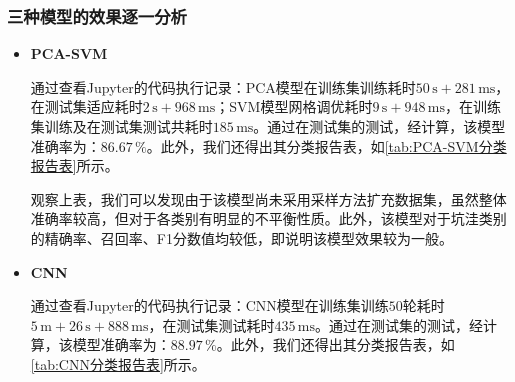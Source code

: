 \documentclass{MathorCupmodeling}
\begin{document}
	\subsubsection{三种模型的效果逐一分析}\label{模型效果}
	\begin{itemize}
		\item \textbf{PCA-SVM}

		通过查看Jupyter的代码执行记录：PCA模型在训练集训练耗时$50\,\text{s}+281\,\text{ms}$，在测试集适应耗时$2\,\text{s}+968\,\text{ms}$；SVM模型网格调优耗时$9\,\text{s}+948\,\text{ms}$，在训练集训练及在测试集测试共耗时$185\,\text{ms}$。通过在测试集的测试，经计算，该模型准确率为：$86.67\,\%$。此外，我们还得出其分类报告表，如\textcolor{blue}{\cref{tab:PCA-SVM分类报告表}}所示。
\begin{table}[htbp]
	\centering
	\caption{PCA-SVM分类报告表}
	\label{tab:PCA-SVM分类报告表}
\end{table}
	观察上表，我们可以发现由于该模型尚未采用采样方法扩充数据集，虽然整体准确率较高，但对于各类别有明显的不平衡性质。此外，该模型对于坑洼类别的精确率、召回率、F1分数值均较低，即说明该模型效果较为一般。
		\item \textbf{CNN}
		
		通过查看Jupyter的代码执行记录：CNN模型在训练集训练$50$轮耗时$5\,\text{m}+26\,\text{s}+888\,\text{ms}$，在测试集测试耗时$435\,\text{ms}$。通过在测试集的测试，经计算，该模型准确率为：$88.97\,\%$。此外，我们还得出其分类报告表，如\textcolor{blue}{\cref{tab:CNN分类报告表}}所示。
\begin{table}[htbp]
	\centering
	\caption{CNN分类报告表}
	\label{tab:CNN分类报告表}
\end{table}


\end{itemize}
\end{document}

